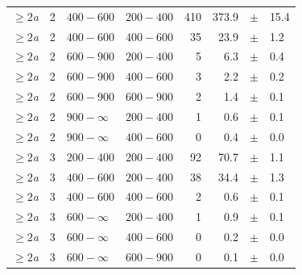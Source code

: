 \begin{table}[!h]
\begin{tabular}{rrllrrcl}
$\geq 2${\it a} & 2 & $ 400- 600$ & $200-400$ &    410 &    373.9 &$\pm$&   15.4 \\
$\geq 2${\it a} & 2 & $ 400- 600$ & $400-600$ &     35 &     23.9 &$\pm$&    1.2 \\
$\geq 2${\it a} & 2 & $ 600- 900$ & $200-400$ &      5 &      6.3 &$\pm$&    0.4 \\
$\geq 2${\it a} & 2 & $ 600- 900$ & $400-600$ &      3 &      2.2 &$\pm$&    0.2 \\
$\geq 2${\it a} & 2 & $ 600- 900$ & $600-900$ &      2 &      1.4 &$\pm$&    0.1 \\
$\geq 2${\it a} & 2 & $ 900- \infty$ & $200-400$ &      1 &      0.6 &$\pm$&    0.1 \\
$\geq 2${\it a} & 2 & $ 900- \infty$ & $400-600$ &      0 &      0.4 &$\pm$&    0.0 \\
$\geq 2${\it a} & 3 & $ 200- 400$ & $200-400$ &     92 &     70.7 &$\pm$&    1.1 \\
$\geq 2${\it a} & 3 & $ 400- 600$ & $200-400$ &     38 &     34.4 &$\pm$&    1.3 \\
$\geq 2${\it a} & 3 & $ 400- 600$ & $400-600$ &      2 &      0.6 &$\pm$&    0.1 \\
$\geq 2${\it a} & 3 & $ 600- \infty$ & $200-400$ &      1 &      0.9 &$\pm$&    0.1 \\
$\geq 2${\it a} & 3 & $ 600- \infty$ & $400-600$ &      0 &      0.2 &$\pm$&    0.0 \\
$\geq 2${\it a} & 3 & $ 600- \infty$ & $600-900$ &      0 &      0.1 &$\pm$&    0.0 \\
    \hline
  \end{tabular}
\end{table}

